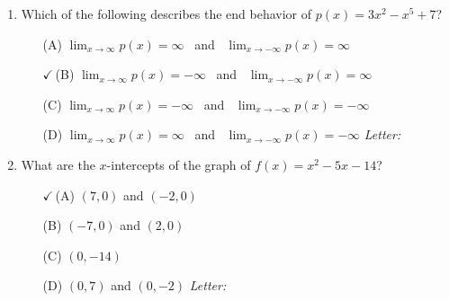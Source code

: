 \documentclass[10pt]{article}
\begin{document}
\begin{enumerate}[leftmargin=1.9em, itemsep=11pt]
\item Which of the following describes the end behavior of $p(x) = 3x^2 - x^5 + 7$?
      \begin{enumerate}[leftmargin=2.6em, itemsep=2pt]
        \item[(A)] $\lim_{x \to \infty} p(x) = \infty$ \ and \ $\lim_{x \to -\infty} p(x) = \infty$
        \item[{\color{keyred}$\checkmark$\,(B)}] $\lim_{x \to \infty} p(x) = -\infty$ \ and \ $\lim_{x \to -\infty} p(x) = \infty$
        \item[(C)] $\lim_{x \to \infty} p(x) = -\infty$ \ and \ $\lim_{x \to -\infty} p(x) = -\infty$
        \item[(D)] $\lim_{x \to \infty} p(x) = \infty$ \ and \ $\lim_{x \to -\infty} p(x) = -\infty$ \hfill\textit{Letter:}~\gradedblank[id=ap3, type=choice, points=1, answer=B]{0.42in}{13pt}
      \end{enumerate}

\item What are the $x$-intercepts of the graph of $f(x) = x^2 - 5x - 14$?
      \begin{enumerate}[leftmargin=2.6em, itemsep=2pt]
        \item[{\color{keyred}$\checkmark$\,(A)}] $(7, 0)$ and $(-2, 0)$
        \item[(B)] $(-7, 0)$ and $(2, 0)$
        \item[(C)] $(0, -14)$
        \item[(D)] $(0, 7)$ and $(0, -2)$ \hfill\textit{Letter:}~\gradedblank[id=ap4, type=choice, points=1, answer=A]{0.42in}{13pt}
      \end{enumerate}


\end{enumerate}
\end{document}
